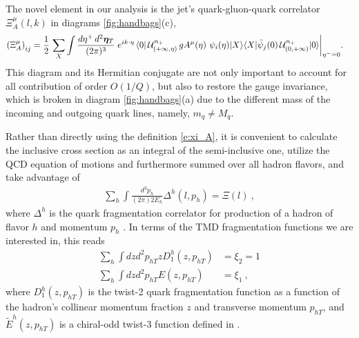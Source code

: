 \documentclass[preprintnumbers,floatfix,nofootinbib]{revtex4}
\newcommand{\de}{d}                    %
\newcommand{\ii}{i}                    %
\newcommand{\mj}{M_q}
\newcommand{\mq}{m_q}
\begin{document}
The novel element in our analysis is the jet's quark-gluon-quark correlator
$\Xi_A^{\mu}(l,k)$ in diagrams \ref{fig:handbags}(c), 
\begin{equation} 
\begin{split} 
  \left(\Xi_A^{\mu} \right)_{ij} &=
   \frac{1}{2}\, \sum_X \int \frac{\de \eta^+\, \de^2 \bm{\eta}_T}{(2\pi)^{3}}\;
   e^{\ii k \cdot \eta}\,
   \langle 0|\,
   {\cal U}^{n_+}_{(+\infty,\eta)}\,
   g A^{\mu}(\eta)\,
   \,\psi_i(\eta)|X\rangle
   \langle X|
             \bar{\psi}_j(0)\,
   {\cal U}^{n_+}_{(0,+\infty)}
   |0\rangle \bigg|_{\eta^-=0} .
\label{e:xi_A}
\end{split} 
\end{equation}  
This diagram and its Hermitian conjugate are not only important to account for
all contribution of order $O(1/Q)$, but also to restore the
gauge invariance, which is broken in diagram \ref{fig:handbags}(a) due to the different mass
of the incoming and outgoing quark lines, namely, $\mq \neq \mj$. 

Rather than directly using the definition \eqref{e:xi_A}, it is convenient to
calculate the inclusive cross section as an integral of the semi-inclusive
one, utilize the QCD equation of motions and furthermore summed over all
hadron flavors, and take advantage of  
\begin{align}
  \label{eq:SIDIS_to_DIS}
  \sum_h \int \frac{d^3p_h}{(2\pi)2E_h} \Delta^h(l,p_h) = \Xi(l) \ , 
\end{align}
where $\Delta^h$ is the quark fragmentation correlator for production of a
hadron of flavor $h$ and momentum $p_h$ \cite{Bacchetta:2006tn}. In terms of
the TMD fragmentation functions we are interested in, this reads 
\begin{align}
  \label{eq:SIDIS_to_DIS_TMDlevel}
  \sum_h \int dz d^2p_{hT} z D_1^h(z,p_{hT}) & = \xi_2 = 1   \\
  \sum_h \int dz d^2p_{hT} E(z,p_{hT}) & = \xi_1 \ ,
\end{align}
where $D_1^h(z,p_{hT})$ is the twist-2 quark fragmentation function as a
function of the hadron's collinear momentum fraction $z$ and transverse
momentum $p_{hT}$, and $\tilde E^h(z,p_{hT})$ is a chiral-odd twist-3 function
defined in \cite{Bacchetta:2006tn}. 
\end{document}
